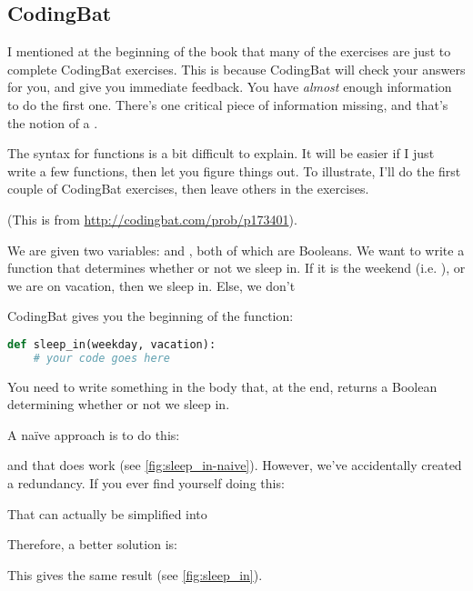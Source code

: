 \subsection{CodingBat}

I mentioned at the beginning of the book that many of the exercises
are just to complete CodingBat exercises. This is because CodingBat
will check your answers for you, and give you immediate feedback. You
have \emph{almost} enough information to do the first one. There's one
critical piece of information missing, and that's the notion of a
.

The syntax for functions is a bit difficult to explain. It will be
easier if I just write a few functions, then let you figure things
out.  To illustrate, I'll do the first couple of CodingBat exercises,
then leave others in the exercises.

\begin{example}
  (This is from \url{http://codingbat.com/prob/p173401}).

  We are given two variables:  and , both
  of which are Booleans. We want to write a function that determines
  whether or not we sleep in. If it is the weekend (i.e. ), or we are on vacation, then we sleep in. Else, we don't

  \begin{solution}
    CodingBat gives you the beginning of the function:

\begin{lstlisting}[language=Python]
def sleep_in(weekday, vacation):
    # your code goes here
\end{lstlisting}
    You need to write something in the body that, at the end, returns
    a Boolean determining whether or not we sleep in.

    A na\"ive approach is to do this:


    and that does work (see \cref{fig:sleep_in-naive}). However, we've
    accidentally created a redundancy. If you ever find yourself doing
    this:


    That can actually be simplified into


    Therefore, a better solution is:


    This gives the same result (see \cref{fig:sleep_in}).
  \end{solution}
\end{example}

